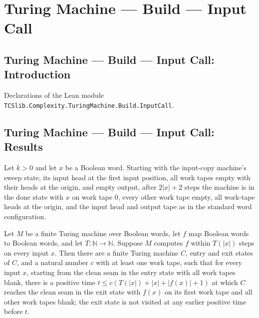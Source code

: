 \section{Turing Machine --- Build --- Input Call}
\subsection*{Turing Machine --- Build --- Input Call: Introduction}

Declarations of the Lean module \texttt{TCSlib.Complexity.TuringMachine.Build.InputCall}.

\subsection*{Turing Machine --- Build --- Input Call: Results}

\begin{theorem}
\label{Turing.FinTM.inputCall_copy}
\leanok
{}
Let $k>0$ and let $x$ be a Boolean word. Starting with the input-copy machine's sweep
state, its input head at the first input position, all work tapes empty with their heads
at the origin, and empty output, after $2|x|+2$ steps the machine is in the done state
with $x$ on work tape $0$, every other work tape empty, all work-tape heads at the
origin, and the input head and output tape as in the standard word configuration.
\end{theorem}

\begin{theorem}
\label{Turing.FinTM.exists_inputCallTM}
\leanok
{}
Let $M$ be a finite Turing machine over Boolean words, let $f$ map Boolean words to
Boolean words, and let $T : \mathbb{N} \to \mathbb{N}$. Suppose $M$ computes $f$
within $T(|x|)$ steps on every input $x$. Then there are a finite Turing machine $C$,
entry and exit states of $C$, and a natural number $c$ with at least one work tape, such
that for every input $x$, starting from the clean seam in the entry state with all work
tapes blank, there is a positive time $t\le c(T(|x|)+|x|+|f(x)|+1)$ at which $C$
reaches the clean seam in the exit state with $f(x)$ on its first work tape and all
other work tapes blank; the exit state is not visited at any earlier positive time
before $t$.
\end{theorem}

